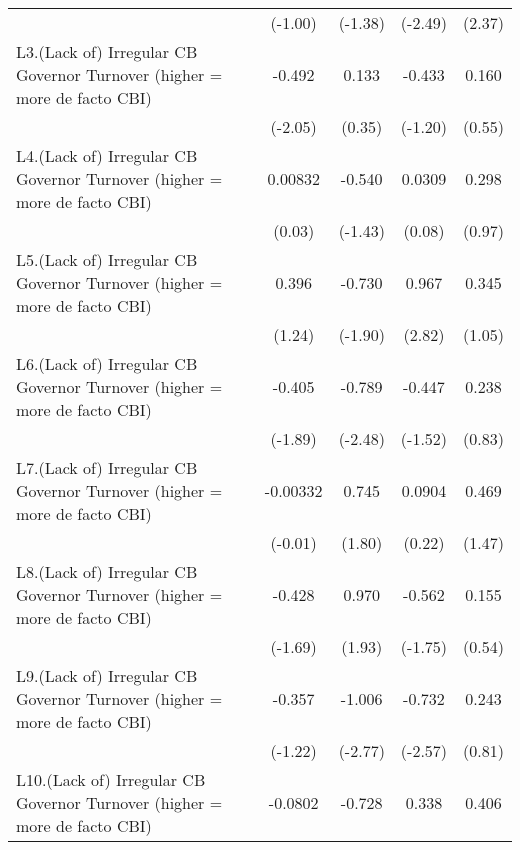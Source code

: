 {\begin{longtable}{l*{4}{c}}
                &  (-1.00)         &  (-1.38)         &  (-2.49)         &   (2.37)         \\
[1em]
L3.(Lack of) Irregular CB Governor Turnover (higher = more de facto CBI)&   -0.492\sym{*}  &    0.133         &   -0.433         &    0.160         \\
                &  (-2.05)         &   (0.35)         &  (-1.20)         &   (0.55)         \\
[1em]
L4.(Lack of) Irregular CB Governor Turnover (higher = more de facto CBI)&  0.00832         &   -0.540         &   0.0309         &    0.298         \\
                &   (0.03)         &  (-1.43)         &   (0.08)         &   (0.97)         \\
[1em]
L5.(Lack of) Irregular CB Governor Turnover (higher = more de facto CBI)&    0.396         &   -0.730         &    0.967\sym{**} &    0.345         \\
                &   (1.24)         &  (-1.90)         &   (2.82)         &   (1.05)         \\
[1em]
L6.(Lack of) Irregular CB Governor Turnover (higher = more de facto CBI)&   -0.405         &   -0.789\sym{*}  &   -0.447         &    0.238         \\
                &  (-1.89)         &  (-2.48)         &  (-1.52)         &   (0.83)         \\
[1em]
L7.(Lack of) Irregular CB Governor Turnover (higher = more de facto CBI)& -0.00332         &    0.745         &   0.0904         &    0.469         \\
                &  (-0.01)         &   (1.80)         &   (0.22)         &   (1.47)         \\
[1em]
L8.(Lack of) Irregular CB Governor Turnover (higher = more de facto CBI)&   -0.428         &    0.970         &   -0.562         &    0.155         \\
                &  (-1.69)         &   (1.93)         &  (-1.75)         &   (0.54)         \\
[1em]
L9.(Lack of) Irregular CB Governor Turnover (higher = more de facto CBI)&   -0.357         &   -1.006\sym{**} &   -0.732\sym{*}  &    0.243         \\
                &  (-1.22)         &  (-2.77)         &  (-2.57)         &   (0.81)         \\
[1em]
L10.(Lack of) Irregular CB Governor Turnover (higher = more de facto CBI)&  -0.0802         &   -0.728\sym{*}  &    0.338         &    0.406         \\

\end{longtable}}
